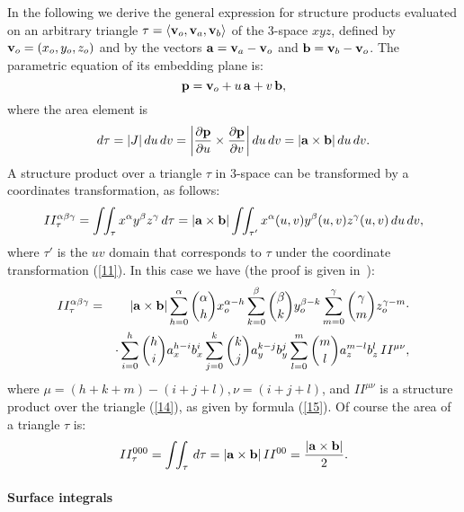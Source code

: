 \documentclass[11pt,oneside]{article}	%
\def\sint{\int\!\!\int}
\begin{document}
In the following we derive the general expression for structure products
evaluated on  an arbitrary triangle 
$\tau=\langle {\bf v}_o,{\bf v}_a,{\bf v}_b \rangle$  of
the 3-space $xyz$, defined by ${\bf v}_o=(x_o,y_o,z_o)$ and
by the vectors ${\bf a}={\bf v}_a-{\bf v}_o$ and 
${\bf b}={\bf v}_b-{\bf v}_o$.
The parametric equation of its embedding plane is:
\begin{equation}\label{11} 
{\bf p} = {\bf v}_o+ u \,{\bf a}+ v\, {\bf b},
\end{equation}
where the area element is 
\begin{equation}\label{12} 
d\tau=
|J|\,du\,dv=
\bigg| {{\partial {\bf p}}\over {\partial u}} 
\times {{\partial {\bf p}}\over {\partial v}} \bigg|\,du\,dv=
|{\bf a}\times{\bf b}|\,du\,dv.
\end{equation}
A structure product over a triangle $\tau$ in 3-space can be transformed
by a coordinates transformation, as follows:
\begin{equation}\label{13} 
II_\tau^{\alpha\beta\gamma}=
\sint_\tau x^\alpha y^\beta z^\gamma \,d\tau
=
|{\bf a}\times{\bf b}|
\sint_{\tau'} {x^{\alpha}(u,v)} {y^{\beta}(u,v)} {z^{\gamma}(u,v)}\,du\,dv,
\end{equation}
where $\tau'$ is the $uv$ domain that corresponds to $\tau$ under the
coordinate transformation (\ref{11}).  In this case we have (the proof
is given in~\cite{CAD:90}):
\begin{eqnarray}
II_\tau^{\alpha\beta\gamma}&=&
|{\bf a}\times{\bf b}|
\sum_{h=0}^{\alpha}
{\alpha\choose h}
x_o^{\alpha-h}
\sum_{k=0}^{\beta}
{\beta \choose k}
y_o^{\beta-k}
\sum_{m=0}^{\gamma}
{\gamma \choose m}
z_o^{\gamma-m} \cdot \nonumber\\ & &
\cdot\sum_{i=0}^{h}
{h\choose i}
a_x^{h-i} b_x^i
\sum_{j=0}^{k}
{k\choose j}
a_y^{k-j} b_y^j
\sum_{l=0}^{m}
{m\choose l}
a_z^{m-l} b_z^l 
\,II^{\mu\nu} \label{17}  ,
\end{eqnarray}
where $\mu=(h+k+m)-(i+j+l), \nu=(i+j+l)$, and $II^{\mu\nu}$ is  a structure product  
over the triangle (\ref{14}), as given by formula (\ref{15}).
Of course the area of a triangle $\tau$
is:
\begin{equation}\label{18} 
II_\tau^{000}=\sint_\tau \,d\tau=
|{\bf a}\times{\bf b}|\,
II^{00}=
{{|{\bf a}\times{\bf b}|}\over 2}.
\end{equation}


\paragraph{Surface integrals}
\end{document}
